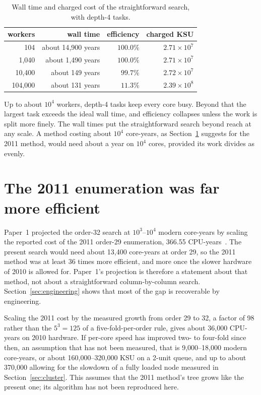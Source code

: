 \begin{table}[H]
\centering
\small
\begin{tabular}{@{}rrrr@{}}
\toprule
workers & wall time & efficiency & charged KSU \\
\midrule
104 & about 14{,}900 years & $100.0\%$ & $2.71\times10^7$ \\
1{,}040 & about 1{,}490 years & $100.0\%$ & $2.71\times10^7$ \\
10{,}400 & about 149 years & $99.7\%$ & $2.72\times10^7$ \\
104{,}000 & about 131 years & $11.3\%$ & $2.39\times10^8$ \\
\bottomrule
\end{tabular}
\caption{Wall time and charged cost of the straightforward search, with depth-4 tasks.}
\label{tab:latency}
\end{table}

\noindent Up to about $10^4$ workers, depth-4 tasks keep every core busy. Beyond that the largest task
exceeds the ideal wall time, and efficiency collapses unless the work is split more finely. The wall
times put the straightforward search beyond reach at any scale. A method costing about $10^4$ core-years,
as Section~\ref{sec:legacy} suggests for the 2011 method, would need about a year on $10^4$ cores,
provided its work divides as evenly.

\section{The 2011 enumeration was far more efficient}
\label{sec:legacy}
Paper~1 projected the order-32 search at $10^3$--$10^4$ modern core-years by scaling the reported cost of
the 2011 order-29 enumeration, 366.55 CPU-years~\cite{drakakis29}. The present search would need about
13{,}400 core-years at order 29, so the 2011 method was at least 36 times more efficient, and more once
the slower hardware of 2010 is allowed for. Paper~1's projection is therefore a statement about that
method, not about a straightforward column-by-column search. Section~\ref{sec:engineering} shows that
most of the gap is recoverable by engineering.

Scaling the 2011 cost by the measured growth from order 29 to 32, a factor of 98 rather than the $5^3=125$
of a five-fold-per-order rule, gives about 36{,}000 CPU-years on 2010 hardware. If per-core speed has
improved two- to four-fold since then, an assumption that has not been measured, that is
9{,}000--18{,}000 modern core-years, or about 160{,}000--320{,}000 KSU on a 2-unit queue, and up to about 370{,}000 allowing for the
slowdown of a fully loaded node measured in Section~\ref{sec:cluster}. This assumes that
the 2011 method's tree grows like the present one; its algorithm has not been reproduced here.

